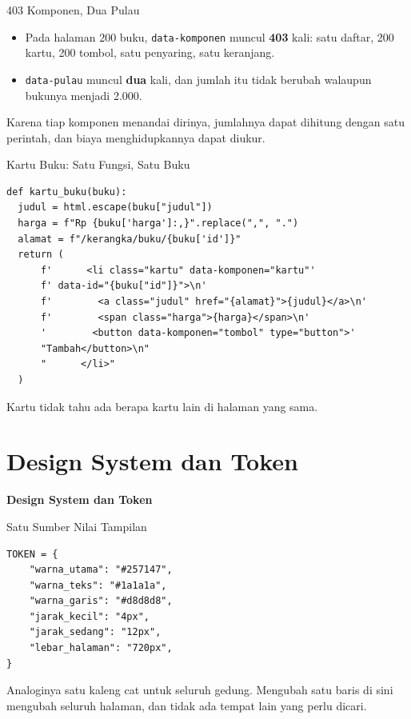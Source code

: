 \documentclass[aspectratio=169, table, 12pt]{beamer}
\begin{document}
\begin{frame}{{\Large 403 Komponen, Dua Pulau}}
  \vspace{12pt}
  \begin{itemize}
    \item Pada halaman 200 buku, \texttt{data-komponen} muncul \textbf{403}
          kali: satu daftar, 200 kartu, 200 tombol, satu penyaring, satu
          keranjang.
    \item \texttt{data-pulau} muncul \textbf{dua} kali, dan jumlah itu tidak
          berubah walaupun bukunya menjadi 2.000.
  \end{itemize}
  \vspace{10pt}
  {\small Karena tiap komponen menandai dirinya, jumlahnya dapat dihitung
  dengan satu perintah, dan biaya menghidupkannya dapat diukur.}
\end{frame}

\begin{frame}[fragile]{{\Large Kartu Buku: Satu Fungsi, Satu Buku}}
  \vspace{2pt}
\begin{lstlisting}[style=PythonStyle]
def kartu_buku(buku):
  judul = html.escape(buku["judul"])
  harga = f"Rp {buku['harga']:,}".replace(",", ".")
  alamat = f"/kerangka/buku/{buku['id']}"
  return (
      f'      <li class="kartu" data-komponen="kartu"'
      f' data-id="{buku["id"]}">\n'
      f'        <a class="judul" href="{alamat}">{judul}</a>\n'
      f'        <span class="harga">{harga}</span>\n'
      '        <button data-komponen="tombol" type="button">'
      "Tambah</button>\n"
      "      </li>"
  )
\end{lstlisting}
  \vspace{2pt}
  {\small Kartu tidak tahu ada berapa kartu lain di halaman yang sama.}
\end{frame}

\section{Design System dan Token}

\begin{frame}{\hfill}
  \centering
  \Huge{\textbf{Design System dan Token}}
\end{frame}

\begin{frame}[fragile]{{\Large Satu Sumber Nilai Tampilan}}
  \vspace{2pt}
\begin{lstlisting}[style=PythonStyle]
TOKEN = {
    "warna_utama": "#257147",
    "warna_teks": "#1a1a1a",
    "warna_garis": "#d8d8d8",
    "jarak_kecil": "4px",
    "jarak_sedang": "12px",
    "lebar_halaman": "720px",
}
\end{lstlisting}
  \vspace{2pt}
  {\small Analoginya satu kaleng cat untuk seluruh gedung. Mengubah satu
  baris di sini mengubah seluruh halaman, dan tidak ada tempat lain yang
  perlu dicari.}
\end{frame}
\end{document}
